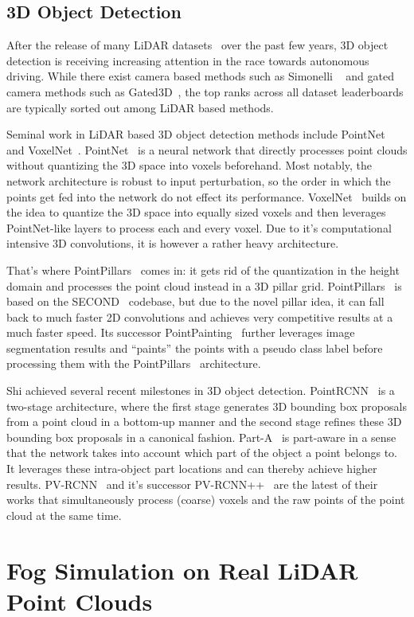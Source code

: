 \documentclass[10pt,twocolumn,letterpaper]{article}
\begin{document}
\subsection{3D Object Detection}
\label{sec:related_detection}

After the release of many LiDAR datasets~\cite{KITTI, nuscenes2019, lyft2019, Argoverse, WaymoOD, Honda3D, A2D2, Apollo, CADC, STF} over the past few years, 3D object detection is receiving increasing attention in the race towards autonomous driving. While there exist camera based methods such as Simonelli \etal ~\cite{Simonelli_2019_ICCV} and gated camera methods such as Gated3D~\cite{Gated3D}, the top ranks across all dataset leaderboards are typically sorted out among LiDAR based methods.

Seminal work in LiDAR based 3D object detection methods include PointNet~\cite{PointNet} and VoxelNet~\cite{VoxelNet}. PointNet~\cite{PointNet} is a neural network that directly processes point clouds without quantizing the 3D space into voxels beforehand. Most notably, the network architecture is robust to input perturbation, so the order in which the points get fed into the network do not effect its performance. VoxelNet~\cite{VoxelNet} builds on the idea to quantize the 3D space into equally sized voxels and then leverages PointNet-like layers to process each and every voxel. Due to it's computational intensive 3D convolutions, it is however a rather heavy architecture. 

That's where PointPillars~\cite{PP} comes in: it gets rid of the quantization in the height domain and processes the point cloud instead in a 3D pillar grid. PointPillars~\cite{PP} is based on the SECOND~\cite{SECOND} codebase, but due to the novel pillar idea, it can fall back to much faster 2D convolutions and achieves very competitive results at a much faster speed. Its successor PointPainting~\cite{PointPainting} further leverages image segmentation results and ``paints'' the points with a pseudo class label before processing them with the PointPillars~\cite{PP} architecture. 

Shi \etal achieved several recent milestones in 3D object detection. PointRCNN~\cite{PRCNN} is a two-stage architecture, where the first stage generates 3D bounding box proposals from a point cloud in a bottom-up manner and the second stage refines these 3D bounding box proposals in a canonical fashion. Part-A~\cite{PartA2} is part-aware in a sense that the network takes into account which part of the object a point belongs to. It leverages these intra-object part locations and can thereby achieve higher results. PV-RCNN~\cite{PV-RCNN} and it's successor PV-RCNN++~\cite{shi2021pvrcnn} are the latest of their works that simultaneously process (coarse) voxels and the raw points of the point cloud at the same time. \section{Fog Simulation on Real LiDAR Point Clouds}
\label{sec:derivation}
\end{document}
